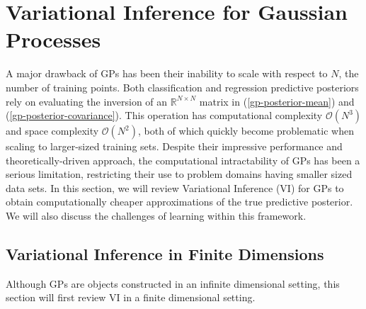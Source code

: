 \documentclass{article}
\numberwithin{equation}{section}
\begin{document}
\section{Variational Inference for Gaussian Processes}\label{section:vi-gp}
A major drawback of GPs has been their inability to scale with respect to $N$, the number of training points. 
Both classification and regression predictive posteriors rely on evaluating the inversion of an $\mathbb{R}^{N \times N}$ matrix in (\ref{gp-posterior-mean}) and (\ref{gp-posterior-covariance}). 
This operation has computational complexity $\mathcal{O}(N^3)$ and space complexity $\mathcal{O}(N^2)$, both of which quickly become problematic when scaling to larger-sized training sets. 
Despite their impressive performance and theoretically-driven approach, the computational intractability of GPs has been a serious limitation, restricting their use to problem domains having smaller sized data sets. 
In this section, we will review Variational Inference (VI) for GPs to obtain computationally cheaper approximations of the true predictive posterior. 
We will also discuss the challenges of learning within this framework.

\subsection{Variational Inference in Finite Dimensions}\label{section:vi-in-finite-dimensions}
Although GPs are objects constructed in an infinite dimensional setting, this section will first review VI in a finite dimensional setting. 
\end{document}
